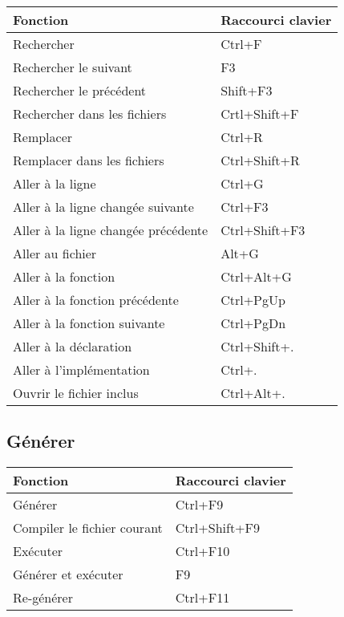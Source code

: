 \begin{tabular}{|l|l|}\hline
Fonction 		                &	Raccourci clavier\\ \hline
Rechercher 		                &	Ctrl+F\\ \hline
Rechercher le suivant 	        &	F3\\ \hline
Rechercher le précédent 	    &	Shift+F3\\ \hline
Rechercher dans les fichiers 	&	Crtl+Shift+F\\ \hline
Remplacer 	                    &	Ctrl+R\\ \hline
Remplacer dans les fichiers     &	Ctrl+Shift+R\\ \hline
Aller à la ligne 	            &	Ctrl+G\\ \hline
Aller à la ligne changée suivante 	&	Ctrl+F3\\ \hline
Aller à la ligne changée précédente	&	Ctrl+Shift+F3\\ \hline
Aller au fichier 	            &	Alt+G\\ \hline
Aller à la fonction	            &	Ctrl+Alt+G\\ \hline
Aller à la fonction précédente  & Ctrl+PgUp\\ \hline
Aller à la fonction suivante    & Ctrl+PgDn\\ \hline
Aller à la déclaration          & Ctrl+Shift+.\\ \hline
Aller à l'implémentation        & Ctrl+.\\ \hline
Ouvrir le fichier inclus        & Ctrl+Alt+.\\ \hline
\end{tabular}

\subsection{Générer}

\begin{tabular}{|l|l|}\hline
Fonction 		            &	Raccourci clavier\\ \hline
Générer 		            &	Ctrl+F9\\ \hline
Compiler le fichier courant	&	Ctrl+Shift+F9\\ \hline
Exécuter		            &	Ctrl+F10\\ \hline
Générer et exécuter 	    &	F9\\ \hline
Re-générer 	                &	Ctrl+F11\\ \hline
\end{tabular}

